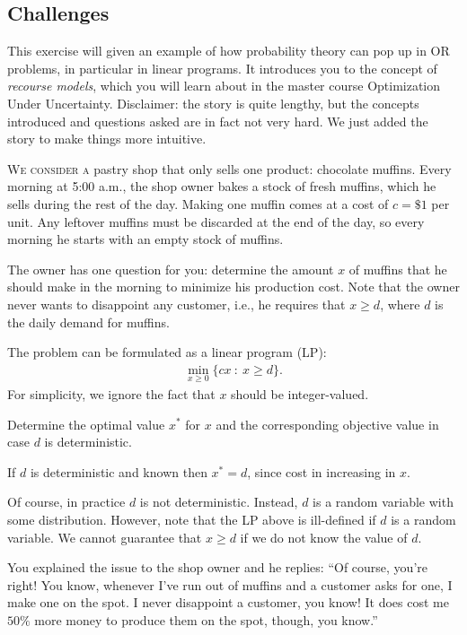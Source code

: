 \documentclass[assignments]{subfiles}
\begin{document}
\subsection{Challenges}
\label{sec:challenges}

This exercise will given an example of how probability theory can pop up in OR problems, in particular in linear programs. It introduces you to the concept of \textit{recourse models}, which you will learn about in the master course Optimization Under Uncertainty. Disclaimer: the story is quite lengthy, but the concepts introduced and questions asked are in fact not very hard. We just added the story to make things more intuitive.

\textsc{We consider a} pastry shop that only sells one product: chocolate muffins. Every morning at 5:00 a.m., the shop owner bakes a stock of fresh muffins, which he sells during the rest of the day. Making one muffin comes at a cost of $c = \$ 1$ per unit. Any leftover muffins must be discarded at the end of the day, so every morning he starts with an empty stock of muffins.

The owner has one question for you: determine the amount $x$ of muffins that he should make in the morning to minimize his production cost. Note that the owner never wants to disappoint any customer, i.e., he requires that $x \geq d$, where $d$ is the daily demand for muffins.

The problem can be formulated as a linear program (LP):
\begin{align}
    \min_{x \geq 0} \{ cx \ : \ x \geq d \}.
\end{align}
For simplicity, we ignore the fact that $x$ should be integer-valued.

\begin{exercise}
Determine the optimal value $x^*$ for $x$ and the corresponding objective value in case $d$ is deterministic.
\begin{solution}
If $d$ is deterministic and known then $x^* = d$, since cost in increasing in $x$.
\end{solution}
\end{exercise}

Of course, in practice $d$ is not deterministic. Instead, $d$ is a random variable with some distribution. However, note that the LP above is ill-defined if $d$ is a random variable. We cannot guarantee that $x \geq d$ if we do not know the value of $d$.

You explained the issue to the shop owner and he replies: ``Of course, you're right! You know, whenever I've run out of muffins and a customer asks for one, I make one on the spot. I never disappoint a customer, you know! It does cost me $50 \%$ more money to produce them on the spot, though, you know.''
\end{document}
